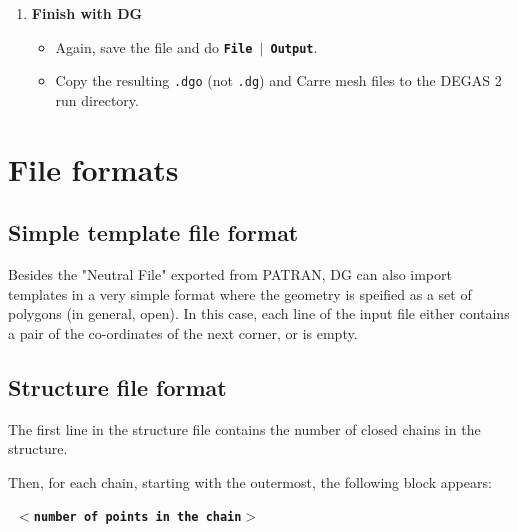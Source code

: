 \documentclass[12pt]{report}
\begin{document}
\begin{enumerate}
\begin{itemize}
\begin{itemize}
flux surface and one along the orthogonal.  If the 
\verb+sonnet_mesh+ keyword in {\tt definegeometry2d} 
will use a subset of the mesh, these elements need to be in that subset.
      \item  Make a note of the corresponding mesh edge to use with the
\verb+iedge+ keyword in {\tt definegeometry2d}.  These are denoted by
S (for ``south'', $i_z = 0$), E (``east'', $i_x = n_x$), N 
(``north'', $i_z = n_z$), or W (``west'', $i_x = 0$).
    \end{itemize}
  \end{itemize}
  \item {\bf Finish with DG}
  \begin{itemize}
    \item Again, save the file and do 
\textbf{\texttt{File \begin{math}\vert{}\end{math} Output}}.
    \item Copy the resulting \verb+.dgo+ (not \verb+.dg+) and Carre mesh
files to the DEGAS 2 run directory.
  \end{itemize}
\end{enumerate}

\chapter{File formats}

\section{Simple template file format}

Besides the "Neutral File" exported from PATRAN, DG can also import
templates in a very simple format where the geometry is speified as a
set of polygons (in general, open). In this case, each line of the
input file either contains a pair of the co-ordinates of the next
corner, or is empty. 

\section{Structure file format}

The first line in the structure file contains the number of closed
chains in the structure.

Then, for each chain, starting with the outermost, the following block
appears:

\textbf{\texttt{ \begin{math}<\end{math}number of points in the
chain\begin{math}>\end{math} }}
\end{document}
